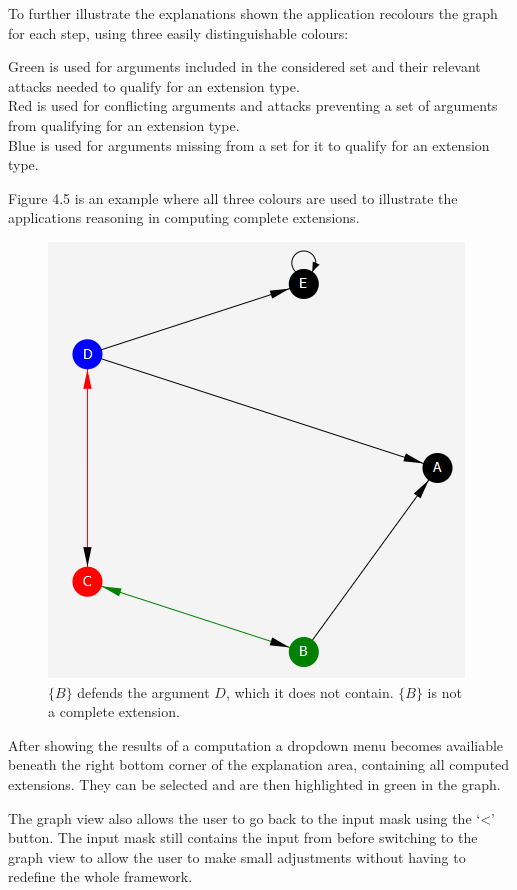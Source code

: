 \documentclass[draft,final]{vutinfth} %
\newcommand{\hl}{\par\vspace{6pt}} %
\begin{document}
To further illustrate the explanations shown the application recolours the graph for each step, using three easily distinguishable colours:\hl
Green is used for arguments included in the considered set and their relevant attacks needed to qualify for an extension type.\\
Red is used for conflicting arguments and attacks preventing a set of arguments from qualifying for an extension type.\\
Blue is used for arguments missing from a set for it to qualify for an extension type.\hl
Figure 4.5 is an example where all three colours are used to illustrate the applications reasoning in computing complete extensions.\hl

\FloatBarrier
	\begin{figure}[!h]
		\centering
		\includegraphics{pics/missing.png}
		\caption[Highlighting of nodes and edges in a graph]{$\{B\}$ defends the argument $D$, which it does not contain. $\{B\}$ is not a complete extension.}
	\end{figure}
\FloatBarrier

After showing the results of a computation a dropdown menu becomes availiable beneath the right bottom corner of the explanation area, containing all computed extensions. They can be selected and are then highlighted in green in the graph.\hl
The graph view also allows the user to go back to the input mask using the `<' button. The input mask still contains the input from before switching to the graph view to allow the user to make small adjustments without having to redefine the whole framework.
\end{document}
